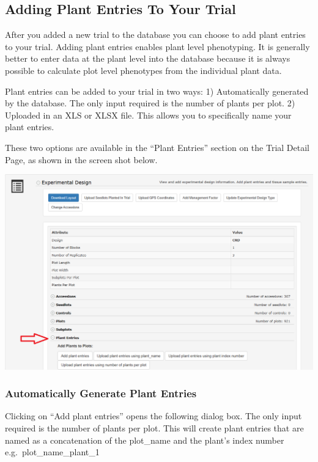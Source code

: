 \documentclass[
  12pt,
]{book}
\begin{document}
\hypertarget{adding-plant-entries-to-your-trial}{%
\subsection{Adding Plant Entries To Your Trial}\label{adding-plant-entries-to-your-trial}}

After you added a new trial to the database you can choose to add plant entries to your trial. Adding plant entries enables plant level phenotyping. It is generally better to enter data at the plant level into the database because it is always possible to calculate plot level phenotypes from the individual plant data.

Plant entries can be added to your trial in two ways: 1) Automatically generated by the database. The only input required is the number of plants per plot. 2) Uploaded in an XLS or XLSX file. This allows you to specifically name your plant entries.

These two options are available in the ``Plant Entries'' section on the Trial Detail Page, as shown in the screen shot below.

\begin{center}\includegraphics[width=0.95\linewidth]{assets/images/trial_detail_page_add_plant_entries} \end{center}

\hypertarget{automatically-generate-plant-entries}{%
\subsubsection*{Automatically Generate Plant Entries}\label{automatically-generate-plant-entries}}


Clicking on ``Add plant entries'' opens the following dialog box. The only input required is the number of plants per plot. This will create plant entries that are named as a concatenation of the plot\_name and the plant's index number e.g.~plot\_name\_plant\_1
\end{document}
